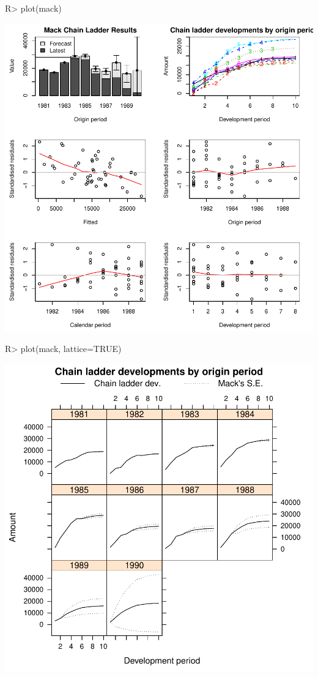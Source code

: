 \documentclass{article}
\begin{document}
\begin{center}
\begin{Schunk}
\begin{Sinput}
R> plot(mack)
\end{Sinput}
\end{Schunk}
\includegraphics{ChainLadder-MackPlot1}
\end{center}

\begin{center}
\begin{Schunk}
\begin{Sinput}
R> plot(mack, lattice=TRUE)
\end{Sinput}
\end{Schunk}
\includegraphics{ChainLadder-MackPlot2}
\end{center}
\end{document}
